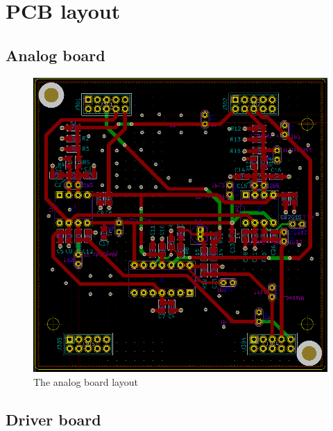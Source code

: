 \section{PCB layout}
\label{app:pcb_layout}
\subsection{Analog board}

\begin{figure} [H]
  \centering
  \includegraphics[width=\linewidth]{pictures/hardware/Analog_Interface_board/analog_layout.png}
  \caption{The analog board layout}
  \label{fig:analog_layout}
\end{figure}

\subsection{Driver board}


